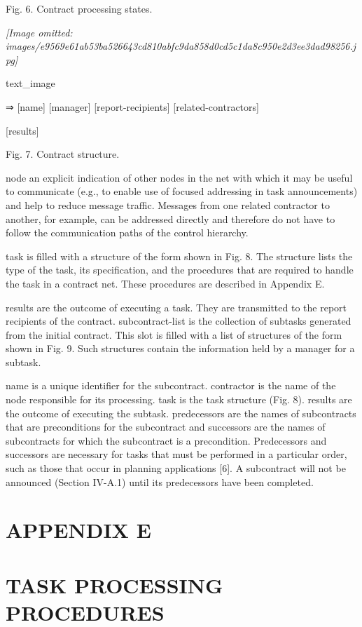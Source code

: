 \documentclass[
]{article}
\begin{document}
Fig. 6. Contract processing states.

\textit{[Image omitted: images/e9569e61ab53ba526643cd810abfc9da858d0cd5c1da8c950e2d3ee3dad98256.jpg]}

text\_image

⇒ {[}name{]} {[}manager{]} {[}report-recipients{]}
{[}related-contractors{]}

{[}results{]}

Fig. 7. Contract structure.

node an explicit indication of other nodes in the net with which it may
be useful to communicate (e.g., to enable use of focused addressing in
task announcements) and help to reduce message traffic. Messages from
one related contractor to another, for example, can be addressed
directly and therefore do not have to follow the communication paths of
the control hierarchy.

task is filled with a structure of the form shown in Fig. 8. The
structure lists the type of the task, its specification, and the
procedures that are required to handle the task in a contract net. These
procedures are described in Appendix E.

results are the outcome of executing a task. They are transmitted to the
report recipients of the contract. subcontract-list is the collection of
subtasks generated from the initial contract. This slot is filled with a
list of structures of the form shown in Fig. 9. Such structures contain
the information held by a manager for a subtask.

name is a unique identifier for the subcontract. contractor is the name
of the node responsible for its processing. task is the task structure
(Fig. 8). results are the outcome of executing the subtask. predecessors
are the names of subcontracts that are preconditions for the subcontract
and successors are the names of subcontracts for which the subcontract
is a precondition. Predecessors and successors are necessary for tasks
that must be performed in a particular order, such as those that occur
in planning applications {[}6{]}. A subcontract will not be announced
(Section IV-A.1) until its predecessors have been completed.

\section{APPENDIX E}\label{appendix-e}

\section{TASK PROCESSING PROCEDURES}\label{task-processing-procedures}
\end{document}
